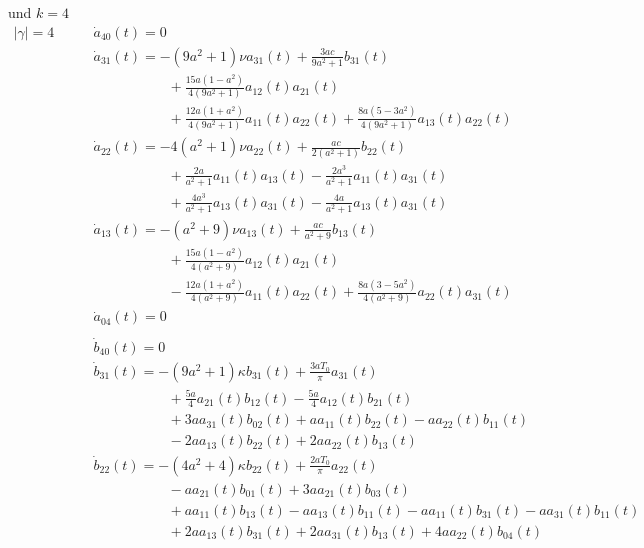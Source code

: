 und $k = 4$
\begin{align*}
|\gamma| = 4
\qquad &
\dot{a}_{40}(t) = 0
\\
&
\dot{a}_{31}(t)
=
-
(9 a^2+1)
\nu
a_{31}(t)
+
\frac{3 a c}{9 a^2+1} b_{31}(t)
\\
&\phantom{aaaaaaaaaa}
+
\frac{15 a (1 - a^2)}{4 (9 a^2+1)} a_{12}(t) a_{21}(t)
\\
&\phantom{aaaaaaaaaa}
+
\frac{12 a (1 + a^2)}{4 (9 a^2+1)} a_{11}(t) a_{22}(t)
+
\frac{8 a (5 - 3 a^2)}{4 (9 a^2+1)} a_{13}(t) a_{22}(t)
\\
&
\dot{a}_{22}(t)
=
-
4
(a^2+1)
\nu
a_{22}(t)
+
\frac{a c}{2 (a^2+1)} b_{22}(t)
\\
&\phantom{aaaaaaaaaa}
+
\frac{2 a}{a^2+1} a_{11}(t) a_{13}(t)
-
\frac{2 a^3}{a^2+1} a_{11}(t) a_{31}(t)
\\
&\phantom{aaaaaaaaaa}
+
\frac{4 a^3}{a^2+1} a_{13}(t) a_{31}(t)
-
\frac{4 a}{a^2+1} a_{13}(t) a_{31}(t)
\\
&
\dot{a}_{13}(t)
=
-
(a^2+9)
\nu
a_{13}(t)
+
\frac{a c}{a^2+9} b_{13}(t)
\\
&\phantom{aaaaaaaaaa}
+
\frac{15 a (1 - a^2)}{4 (a^2+9)} a_{12}(t) a_{21}(t)
\\
&\phantom{aaaaaaaaaa}
-
\frac{12 a (1 + a^2)}{4 (a^2+9)} a_{11}(t) a_{22}(t)
+
\frac{8 a (3 - 5 a^2)}{4 (a^2+9)} a_{22}(t) a_{31}(t)
\\
&
\dot{a}_{04}(t) = 0
\\
\\
&
\dot{b}_{40}(t) = 0
\\
&
\dot{b}_{31}(t)
=
-
(9 a^2+1)
\kappa
b_{31}(t)
+
\frac{3 a T_{0}}{\pi} a_{31}(t)
\\
&\phantom{aaaaaaaaaa}
+
\frac{5 a}{4} a_{21}(t) b_{12}(t)
-
\frac{5 a}{4} a_{12}(t) b_{21}(t)
\\
&\phantom{aaaaaaaaaa}
+
3 a
a_{31}(t) b_{02}(t)
+
a
a_{11}(t) b_{22}(t)
-
a
a_{22}(t) b_{11}(t)
\\
&\phantom{aaaaaaaaaa}
-
2 a
a_{13}(t) b_{22}(t)
+
2 a
a_{22}(t) b_{13}(t)
\\
&
\dot{b}_{22}(t)
=
-
(4 a^2+4)
\kappa
b_{22}(t)
+
\frac{2 a T_{0}}{\pi} a_{22}(t)
\\
&\phantom{aaaaaaaaaa}
-
a
a_{21}(t) b_{01}(t)
+
3 a
a_{21}(t) b_{03}(t)
\\
&\phantom{aaaaaaaaaa}
+
a
a_{11}(t) b_{13}(t)
-
a
a_{13}(t) b_{11}(t)
-
a
a_{11}(t) b_{31}(t)
-
a
a_{31}(t) b_{11}(t)
\\
&\phantom{aaaaaaaaaa}
+
2 a
a_{13}(t) b_{31}(t)
+
2 a
a_{31}(t) b_{13}(t)
+
4 a
a_{22}(t) b_{04}(t)

\end{align*}
